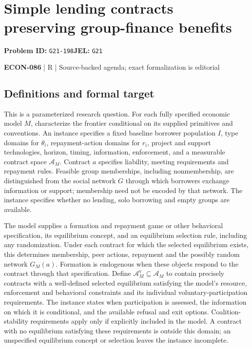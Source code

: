 \documentclass[11pt,a4paper]{article}
\begin{document}
\section*{Simple lending contracts preserving group-finance benefits}
\textbf{Problem ID:} \texttt{G21-198}\quad \textbf{JEL:} \texttt{G21}\par
\label{problem:OP-0647}


\label{audited:ECON-086}

{\sffamily\small\color{muted}\textbf{ECON-086} | R | Source-backed agenda; exact formalization is editorial\par}

\subsection*{Definitions and formal target}

This is a parameterized research question. For each fully specified economic model \(M\), characterize the frontier conditional on its supplied primitives and conventions. An instance specifies a fixed baseline borrower population \(I\), type domains for \(\theta_i\), repayment-action domains for \(r_i\), project and support technologies, horizon, timing, information, enforcement, and a measurable contract space \(\mathcal A_M\). Contract \(a\) specifies liability, meeting requirements and repayment rules. Feasible group memberships, including nonmembership, are distinguished from the social network \(G\) through which borrowers exchange information or support; membership need not be encoded by that network. The instance specifies whether no lending, solo borrowing and empty groups are available.

The model supplies a formation and repayment game or other behavioral specification, its equilibrium concept, and an equilibrium selection rule, including any randomization. Under each contract for which the selected equilibrium exists, this determines membership, peer actions, repayment and the possibly random network \(G_M(a)\). Formation is endogenous when these objects respond to the contract through that specification. Define \(\mathcal A_M^{\mathrm v}\subseteq\mathcal A_M\) to contain precisely contracts with a well-defined selected equilibrium satisfying the model's resource, enforcement and behavioral constraints and its individual voluntary-participation requirements. The instance states when participation is assessed, the information on which it is conditional, and the available refusal and exit options. Coalition-stability requirements apply only if explicitly included in the model. A contract with no equilibrium satisfying these requirements is outside this domain; an unspecified equilibrium concept or selection leaves the instance incomplete.
\end{document}
